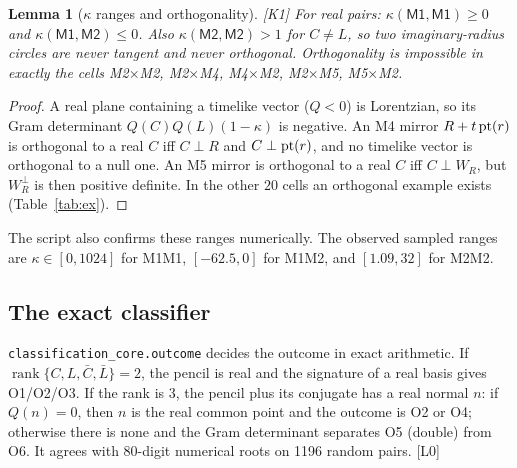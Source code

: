 \documentclass[11pt]{article}
\newtheorem{lemma}[theorem]{Lemma}\newtheorem{corollary}[theorem]{Corollary}
\theoremstyle{definition}\newtheorem{definition}[theorem]{Definition}\newtheorem{remark}[theorem]{Remark}\newtheorem{example}[theorem]{Example}
\newcommand{\chk}[1]{\hfill{\footnotesize\textsf{[#1]}}}
\newcommand{\cls}[1]{\textsf{#1}}
\begin{document}
\begin{lemma}[$\kappa$ ranges and orthogonality]\label{lem:kappa}\chk{K1}
For real pairs: $\kappa(\cls{M1},\cls{M1})\ge0$ and $\kappa(\cls{M1},\cls{M2})\le0$. Also $\kappa(\cls{M2},\cls{M2})>1$ for $C\ne L$, so \emph{two imaginary-radius circles are never tangent and never orthogonal}. Orthogonality is impossible in exactly the cells \cls{M2}$\times$\cls{M2}, \cls{M2}$\times$\cls{M4}, \cls{M4}$\times$\cls{M2}, \cls{M2}$\times$\cls{M5}, \cls{M5}$\times$\cls{M2}.
\end{lemma}
\begin{proof}
A real plane containing a timelike vector ($Q<0$) is Lorentzian, so its Gram determinant $Q(C)Q(L)(1-\kappa)$ is negative. An \cls{M4} mirror $R+t\,\mathrm{pt}(r)$ is orthogonal to a real $C$ iff $C\perp R$ and $C\perp\mathrm{pt}(r)$, and no timelike vector is orthogonal to a null one. An \cls{M5} mirror is orthogonal to a real $C$ iff $C\perp W_R$, but $W_R^\perp$ is then positive definite. In the other $20$ cells an orthogonal example exists (Table~\ref{tab:ex}).
\end{proof}
The script also confirms these ranges numerically. The observed sampled ranges are $\kappa\in[0,1024]$ for \cls{M1}\cls{M1}, $[-62.5,0]$ for \cls{M1}\cls{M2}, and $[1.09,32]$ for \cls{M2}\cls{M2}.

\subsection{The exact classifier}
\texttt{classification\_core.outcome} decides the outcome in exact arithmetic. If $\operatorname{rank}\{C,L,\bar C,\bar L\}=2$, the pencil is real and the signature of a real basis gives O1/O2/O3. If the rank is $3$, the pencil plus its conjugate has a real normal $n$: if $Q(n)=0$, then $n$ is the real common point and the outcome is O2 or O4; otherwise there is none and the Gram determinant separates O5 (double) from O6. It agrees with 80-digit numerical roots on 1196 random pairs. \chk{L0}
\end{document}
